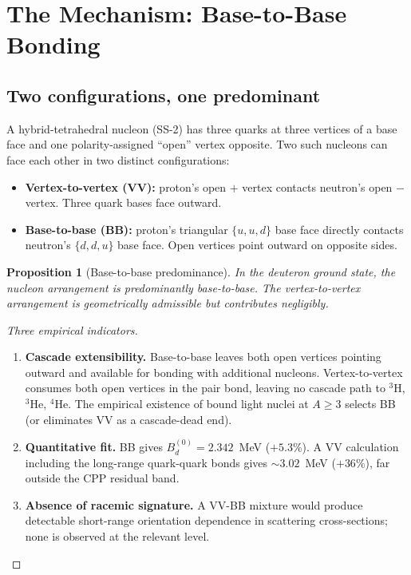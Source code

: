 \documentclass[11pt,letterpaper]{article}
\newtheorem{proposition}[theorem]{Proposition}
\newcommand{\Bdlo}{B_{d}^{(0)}}
\begin{document}
\section{The Mechanism: Base-to-Base Bonding}
\label{sec:mechanism}

\subsection{Two configurations, one predominant}
\label{sec:two_configs}

A hybrid-tetrahedral nucleon (SS-2) has three quarks at three vertices of a base face and one polarity-assigned ``open'' vertex opposite. Two such nucleons can face each other in two distinct configurations:

\begin{itemize}
\item \textbf{Vertex-to-vertex (VV):} proton's open $+$ vertex contacts neutron's open $-$ vertex. Three quark bases face outward.
\item \textbf{Base-to-base (BB):} proton's triangular $\{u, u, d\}$ base face directly contacts neutron's $\{d, d, u\}$ base face. Open vertices point outward on opposite sides.
\end{itemize}

\begin{proposition}[Base-to-base predominance]
\label{prop:BB}
In the deuteron ground state, the nucleon arrangement is predominantly base-to-base. The vertex-to-vertex arrangement is geometrically admissible but contributes negligibly.
\end{proposition}

\begin{proof}[Three empirical indicators]
\begin{enumerate}
\item \textbf{Cascade extensibility.} Base-to-base leaves both open vertices pointing outward and available for bonding with additional nucleons. Vertex-to-vertex consumes both open vertices in the pair bond, leaving no cascade path to ${}^3$H, ${}^3$He, ${}^4$He. The empirical existence of bound light nuclei at $A \geq 3$ selects BB (or eliminates VV as a cascade-dead end).
\item \textbf{Quantitative fit.} BB gives $\Bdlo = 2.342$~MeV ($+5.3\%$). A VV calculation including the long-range quark-quark bonds gives $\sim 3.02$~MeV ($+36\%$), far outside the CPP residual band.
\item \textbf{Absence of racemic signature.} A VV-BB mixture would produce detectable short-range orientation dependence in scattering cross-sections; none is observed at the relevant level.
\end{enumerate}
\end{proof}
\end{document}
